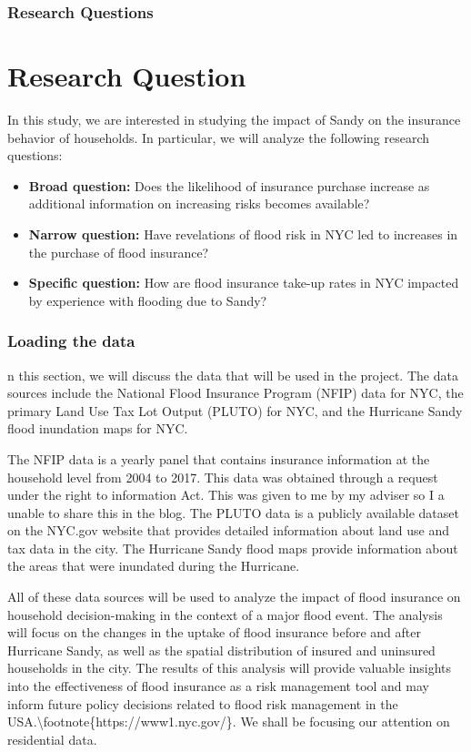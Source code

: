 \documentclass[
  letterpaper,
  DIV=11,
  numbers=noendperiod]{scrartcl}
\begin{document}
\hypertarget{research-questions}{%
\subsubsection{Research Questions}\label{research-questions}}

\section{Research Question}

In this study, we are interested in studying the impact of Sandy on the
insurance behavior of households. In particular, we will analyze the
following research questions:

\begin{itemize}
\item
  \textbf{Broad question:} Does the likelihood of insurance purchase
  increase as additional information on increasing risks becomes
  available?
\item
  \textbf{Narrow question:} Have revelations of flood risk in NYC led to
  increases in the purchase of flood insurance?
\item
  \textbf{Specific question:} How are flood insurance take-up rates in
  NYC impacted by experience with flooding due to Sandy?
\end{itemize}

\hypertarget{loading-the-data}{%
\subsubsection{Loading the data}\label{loading-the-data}}

n this section, we will discuss the data that will be used in the
project. The data sources include the National Flood Insurance Program
(NFIP) data for NYC, the primary Land Use Tax Lot Output (PLUTO) for
NYC, and the Hurricane Sandy flood inundation maps for NYC.

The NFIP data is a yearly panel that contains insurance information at
the household level from 2004 to 2017. This data was obtained through a
request under the right to information Act. This was given to me by my
adviser so I a unable to share this in the blog. The PLUTO data is a
publicly available dataset on the NYC.gov website that provides detailed
information about land use and tax data in the city. The Hurricane Sandy
flood maps provide information about the areas that were inundated
during the Hurricane.

All of these data sources will be used to analyze the impact of flood
insurance on household decision-making in the context of a major flood
event. The analysis will focus on the changes in the uptake of flood
insurance before and after Hurricane Sandy, as well as the spatial
distribution of insured and uninsured households in the city. The
results of this analysis will provide valuable insights into the
effectiveness of flood insurance as a risk management tool and may
inform future policy decisions related to flood risk management in the
USA.\textbackslash footnote\{https://www1.nyc.gov/\}. We shall be
focusing our attention on residential data.
\end{document}
